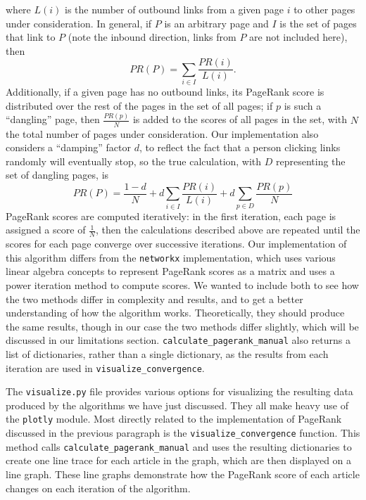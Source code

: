 \documentclass[fontsize=11pt]{article}
\begin{document}
where \(L(i)\) is the number of outbound links from a given page \(i\) to other pages under consideration.
In general, if \(P\) is an arbitrary page and \(I\) is the set of pages that link to \(P\) (note the inbound direction, links from \(P\) are not included here), then
$$PR(P) = \sum_{i \in I} \frac{PR(i)}{L(i)}.$$ Additionally, if a given page has no outbound links, its PageRank score is distributed over the rest of the pages in the set of all pages; if \(p\) is such a ``dangling'' page, then \(\frac{PR(p)}{N}\) is added to the scores of all pages in the set, with \(N\) the total number of pages under consideration. Our implementation also considers a ``damping'' factor \(d\), to reflect the fact that a person clicking links randomly will eventually stop, so the true calculation, with \(D\) representing the set of dangling pages, is
$$PR(P) = \frac{1-d}{N} + d\sum_{i \in I} \frac{PR(i)}{L(i)} + d \sum_{p \in D} \frac{PR(p)}{N}$$
PageRank scores are computed iteratively: in the first iteration, each page is assigned a score of \(\frac{1}{N}\), then the calculations described above are repeated until the scores for each page converge over successive iterations.
Our implementation of this algorithm differs from the \texttt{networkx} implementation, which uses various linear algebra concepts to represent PageRank scores as a matrix and uses a power iteration method to compute scores. We wanted to include both to see how the two methods differ in complexity and results, and to get a better understanding of how the algorithm works. Theoretically, they should produce the same results, though in our case the two methods differ slightly, which will be discussed in our limitations section. \texttt{calculate\_pagerank\_manual} also returns a list of dictionaries, rather than a single dictionary, as the results from each iteration are used in \texttt{visualize\_convergence}.

The \texttt{visualize.py} file provides various options for visualizing the resulting data produced by the algorithms we have just discussed. They all make heavy use of the \texttt{plotly} module. Most directly related to the implementation of PageRank discussed in the previous paragraph is the \texttt{visualize\_convergence} function. This method calls \texttt{calculate\_pagerank\_manual} and uses the resulting dictionaries to create one line trace for each article in the graph, which are then displayed on a line graph. These line graphs demonstrate how the PageRank score of each article changes on each iteration of the algorithm.
\end{document}

